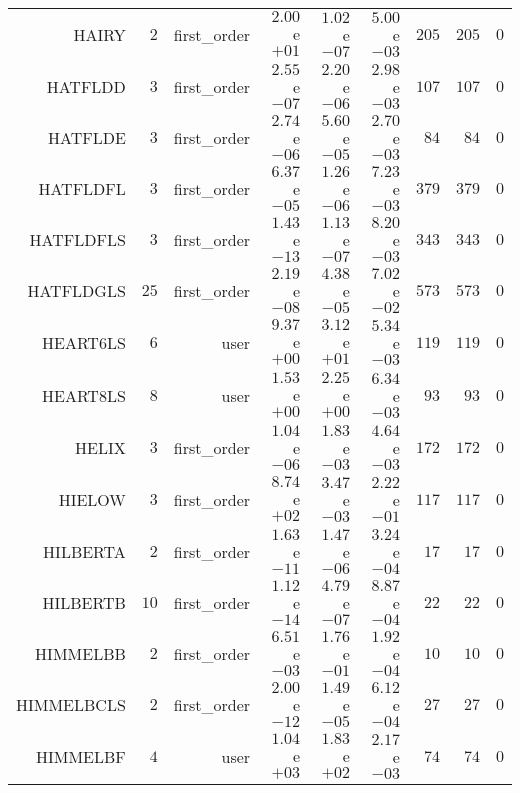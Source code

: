 \begin{longtable}{rrrrrrrrr}
HAIRY & \(     2\) & first\_order & \( 2.00\)e\(+01\) & \( 1.02\)e\(-07\) & \( 5.00\)e\(-03\) & \(   205\) & \(   205\) & \(     0\) \\
HATFLDD & \(     3\) & first\_order & \( 2.55\)e\(-07\) & \( 2.20\)e\(-06\) & \( 2.98\)e\(-03\) & \(   107\) & \(   107\) & \(     0\) \\
HATFLDE & \(     3\) & first\_order & \( 2.74\)e\(-06\) & \( 5.60\)e\(-05\) & \( 2.70\)e\(-03\) & \(    84\) & \(    84\) & \(     0\) \\
HATFLDFL & \(     3\) & first\_order & \( 6.37\)e\(-05\) & \( 1.26\)e\(-06\) & \( 7.23\)e\(-03\) & \(   379\) & \(   379\) & \(     0\) \\
HATFLDFLS & \(     3\) & first\_order & \( 1.43\)e\(-13\) & \( 1.13\)e\(-07\) & \( 8.20\)e\(-03\) & \(   343\) & \(   343\) & \(     0\) \\
HATFLDGLS & \(    25\) & first\_order & \( 2.19\)e\(-08\) & \( 4.38\)e\(-05\) & \( 7.02\)e\(-02\) & \(   573\) & \(   573\) & \(     0\) \\
HEART6LS & \(     6\) & user & \( 9.37\)e\(+00\) & \( 3.12\)e\(+01\) & \( 5.34\)e\(-03\) & \(   119\) & \(   119\) & \(     0\) \\
HEART8LS & \(     8\) & user & \( 1.53\)e\(+00\) & \( 2.25\)e\(+00\) & \( 6.34\)e\(-03\) & \(    93\) & \(    93\) & \(     0\) \\
HELIX & \(     3\) & first\_order & \( 1.04\)e\(-06\) & \( 1.83\)e\(-03\) & \( 4.64\)e\(-03\) & \(   172\) & \(   172\) & \(     0\) \\
HIELOW & \(     3\) & first\_order & \( 8.74\)e\(+02\) & \( 3.47\)e\(-03\) & \( 2.22\)e\(-01\) & \(   117\) & \(   117\) & \(     0\) \\
HILBERTA & \(     2\) & first\_order & \( 1.63\)e\(-11\) & \( 1.47\)e\(-06\) & \( 3.24\)e\(-04\) & \(    17\) & \(    17\) & \(     0\) \\
HILBERTB & \(    10\) & first\_order & \( 1.12\)e\(-14\) & \( 4.79\)e\(-07\) & \( 8.87\)e\(-04\) & \(    22\) & \(    22\) & \(     0\) \\
HIMMELBB & \(     2\) & first\_order & \( 6.51\)e\(-03\) & \( 1.76\)e\(-01\) & \( 1.92\)e\(-04\) & \(    10\) & \(    10\) & \(     0\) \\
HIMMELBCLS & \(     2\) & first\_order & \( 2.00\)e\(-12\) & \( 1.49\)e\(-05\) & \( 6.12\)e\(-04\) & \(    27\) & \(    27\) & \(     0\) \\
HIMMELBF & \(     4\) & user & \( 1.04\)e\(+03\) & \( 1.83\)e\(+02\) & \( 2.17\)e\(-03\) & \(    74\) & \(    74\) & \(     0\) \\

\end{longtable}

